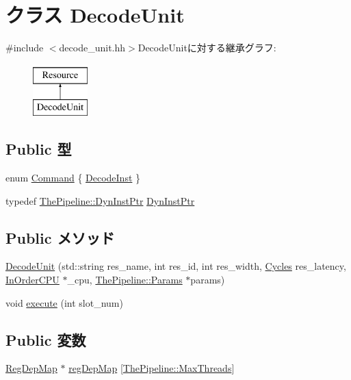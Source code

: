 \hypertarget{classDecodeUnit}{
\section{クラス DecodeUnit}
\label{classDecodeUnit}
}


{\ttfamily \#include $<$decode\_\-unit.hh$>$}DecodeUnitに対する継承グラフ:\begin{figure}[H]
\begin{center}
\leavevmode
\includegraphics[height=2cm]{classDecodeUnit}
\end{center}
\end{figure}
\subsection*{Public 型}
\begin{DoxyCompactItemize}
\item 
enum \hyperlink{classDecodeUnit_a2afce0a47a93eee73a314d53e4890153}{Command} \{ \hyperlink{classDecodeUnit_a2afce0a47a93eee73a314d53e4890153a06bfab31afb6d955d0e4563b38dbe879}{DecodeInst}
 \}
\item 
typedef \hyperlink{classRefCountingPtr}{ThePipeline::DynInstPtr} \hyperlink{classDecodeUnit_af9d0c8a46736ba6aa2d8bb94da1a5e73}{DynInstPtr}
\end{DoxyCompactItemize}
\subsection*{Public メソッド}
\begin{DoxyCompactItemize}
\item 
\hyperlink{classDecodeUnit_a1e59768581eb70852e4d620f3fdee401}{DecodeUnit} (std::string res\_\-name, int res\_\-id, int res\_\-width, \hyperlink{classCycles}{Cycles} res\_\-latency, \hyperlink{classInOrderCPU}{InOrderCPU} $\ast$\_\-cpu, \hyperlink{namespaceThePipeline_ab62ca16eeca26566ad2422b5df4943ce}{ThePipeline::Params} $\ast$params)
\item 
void \hyperlink{classDecodeUnit_a7b7fff82f8c9cbdb02add1346f60bb9e}{execute} (int slot\_\-num)
\end{DoxyCompactItemize}
\subsection*{Public 変数}
\begin{DoxyCompactItemize}
\item 
\hyperlink{classRegDepMap}{RegDepMap} $\ast$ \hyperlink{classDecodeUnit_aa0933c90c5ced66e85669c2982b165a6}{regDepMap} \mbox{[}\hyperlink{namespaceThePipeline_ac9c0bbe9cf27d93e08ea8ccc4096e633}{ThePipeline::MaxThreads}\mbox{]}
\end{DoxyCompactItemize}



